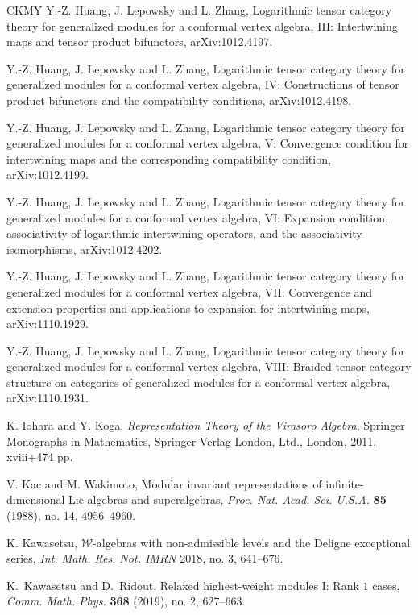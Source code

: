 \documentclass[11pt, reqno]{amsart}
\theoremstyle{definition}\newtheorem{defi}[thm]{Definition}
\theoremstyle{definition}\newtheorem{rem}[thm]{Remark}
\theoremstyle{definition}\newtheorem{exam}[thm]{Example}
\theoremstyle{definition}\newtheorem{assum}[thm]{Assumption}
\begin{document}
\begin{thebibliography}{CKMY}
Y.-Z. Huang, J. Lepowsky and L. Zhang, Logarithmic tensor category theory for
generalized modules for a conformal vertex algebra, III: Intertwining maps and
tensor product bifunctors, arXiv:1012.4197.
	
Y.-Z. Huang, J. Lepowsky and L. Zhang, Logarithmic tensor category theory for
generalized modules for a conformal vertex algebra, IV: Constructions of tensor
product bifunctors and the compatibility conditions, arXiv:1012.4198.
	
Y.-Z. Huang, J. Lepowsky and L. Zhang, Logarithmic tensor category theory for
generalized modules for a conformal vertex algebra, V: Convergence condition
for intertwining maps and the corresponding compatibility condition,
arXiv:1012.4199.
	
Y.-Z. Huang, J. Lepowsky and L. Zhang, Logarithmic tensor category theory for
generalized modules for a conformal vertex algebra, VI: Expansion condition,
associativity of logarithmic intertwining operators, and the associativity
isomorphisms, arXiv:1012.4202.
	
Y.-Z. Huang, J. Lepowsky and L. Zhang, Logarithmic tensor category theory for
generalized modules for a conformal vertex algebra, VII: Convergence and
extension properties and applications to expansion for intertwining maps,
arXiv:1110.1929.
	
Y.-Z. Huang, J. Lepowsky and L. Zhang, Logarithmic tensor category theory for
generalized modules for a conformal vertex algebra, VIII: Braided tensor
category structure on categories of generalized modules for a conformal vertex
algebra, arXiv:1110.1931.

K. Iohara and Y. Koga, \textit{Representation Theory of the Virasoro Algebra}, Springer Monographs in Mathematics, Springer-Verlag London, Ltd., London, 2011, xviii+474 pp.

V. Kac and M. Wakimoto, Modular invariant representations of infinite-dimensional Lie algebras and superalgebras, \textit{Proc. Nat. Acad. Sci. U.S.A.} \textbf{85} (1988), no. 14, 4956--4960.

K. Kawasetsu, $\mathcal{W}$-algebras with non-admissible levels and the Deligne exceptional series, \textit{Int. Math. Res. Not. IMRN} 2018, no. 3, 641--676.

K.~Kawasetsu and D.~Ridout,
Relaxed highest-weight modules I: Rank $1$ cases,
\textit{Comm. Math. Phys.} \textbf{368} (2019), no. 2, 627--663.


\end{thebibliography}
\end{document}
